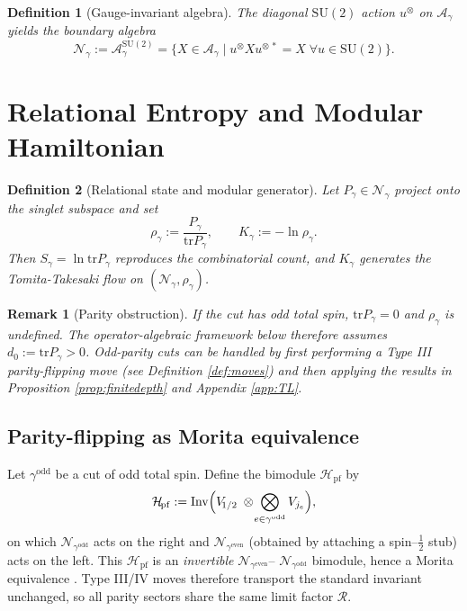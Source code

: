 \documentclass[11pt]{article}
\newtheorem{definition}{Definition}[section]
\newtheorem{remark}{Remark}[section]
\begin{document}
\begin{definition}[Gauge-invariant algebra]
The diagonal $\mathrm{SU}(2)$ action $u^{\otimes}$ on
$\mathcal A_\gamma$ yields the \emph{boundary algebra}
\[
  \mathcal N_{\gamma} := 
  \mathcal A_{\gamma}^{\mathrm{SU}(2)}
  =
  \{X\in\mathcal A_{\gamma}\mid
    u^{\otimes} X u^{\otimes\,*}=X\;\forall u\in \mathrm{SU}(2)\}.
\]
\end{definition}

\section{Relational Entropy and Modular Hamiltonian}

\begin{definition}[Relational state and modular generator]
Let $P_{\gamma}\in\mathcal N_{\gamma}$ project onto the singlet subspace and set
\[
  \rho_{\gamma}:=\frac{P_{\gamma}}{\mathrm{tr}P_{\gamma}},\qquad
  K_{\gamma}:=-\ln\rho_{\gamma}.
\]
Then $S_{\gamma}=\ln\mathrm{tr}P_{\gamma}$ reproduces the combinatorial count,
and $K_{\gamma}$ generates the Tomita-Takesaki flow on
$(\mathcal N_{\gamma},\rho_{\gamma})$.
\end{definition}

\begin{remark}[Parity obstruction]\label{rem:parity}
If the cut has \emph{odd} total spin, $\mathrm{tr}P_{\gamma}=0$ and
$\rho_{\gamma}$ is undefined.
The operator-algebraic framework below therefore assumes
$d_0:=\mathrm{tr}P_{\gamma}>0$.
Odd-parity cuts can be handled by first performing a Type III
parity-flipping move (see Definition \ref{def:moves}) and then applying the
results in Proposition \ref{prop:finitedepth} and Appendix \ref{app:TL}.
\end{remark}


\subsection*{Parity-flipping as Morita equivalence}

Let $\gamma^{\mathrm{odd}}$ be a cut of odd total spin.
Define the bimodule $\mathcal{H}_{\!\mathrm{pf}}$ by
\[
  \mathcal{H}_{\!\mathrm{pf}}
  :=\operatorname{Inv}\Bigl(
      V_{\!1/2}\;\otimes\!
      \bigotimes_{e\in\gamma^{\mathrm{odd}}}V_{j_e}
    \Bigr),
\]
on which
$\mathcal N_{\gamma^{\mathrm{odd}}}$ acts on the right and
$\mathcal N_{\gamma^{\mathrm{even}}}$ (obtained by attaching a spin–$\frac12$
stub) acts on the left.  This $\mathcal H_{\!\mathrm{pf}}$ is an
\emph{invertible} $\mathcal N_{\gamma^{\mathrm{even}}}$–%
$\mathcal N_{\gamma^{\mathrm{odd}}}$ bimodule, hence a Morita equivalence
\cite[Def.~2.1]{PopaCBMS}.  Type III/IV moves therefore transport the standard
invariant unchanged, so all parity sectors share the same limit factor
$\mathcal R$.
\end{document}
